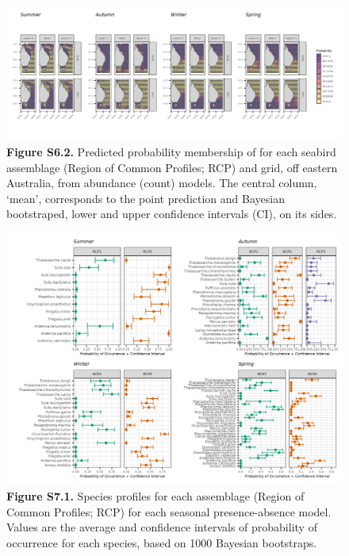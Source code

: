 \documentclass[
]{article}
\begin{document}
\begin{landscape}
\newpage

\begin{figure}
\centering
\includegraphics{../results/FigS5_2_prob-pred-NegBin.png}
\caption{\textbf{Figure S6.2.} Predicted probability membership of for
each seabird assemblage (Region of Common Profiles; RCP) and grid, off
eastern Australia, from abundance (count) models. The central column,
`mean', corresponds to the point prediction and Bayesian bootstraped,
lower and upper confidence intervals (CI), on its sides.}
\end{figure}

\newpage

\begin{figure}
\centering
\includegraphics{../results/FigS7_1_spp-profiles-Bernoulli.png}
\caption{\textbf{Figure S7.1.} Species profiles for each assemblage
(Region of Common Profiles; RCP) for each seasonal presence-absence
model. Values are the average and confidence intervals of probability of
occurrence for each species, based on 1000 Bayesian bootstraps.}
\end{figure}


\end{landscape}
\end{document}
